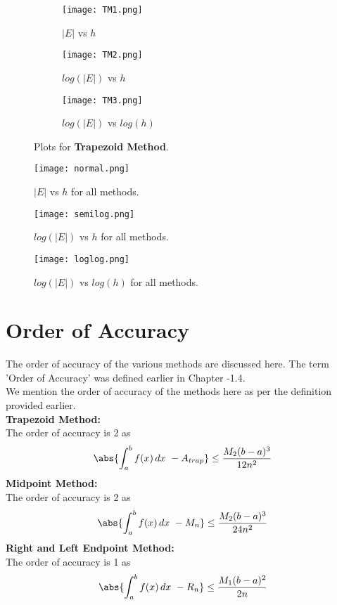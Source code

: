 \documentclass[a4paper, 12pt]{report}
\begin{document}
\begin{figure}[!h]
\centering
\begin{subfigure}{.55\textwidth}
  \centering
  \texttt{[image: TM1.png]}
  \caption{$|E|$ vs $h$}
\end{subfigure}%
\begin{subfigure}{.55\textwidth}
  \centering
  \texttt{[image: TM2.png]}
  \caption{$log(|E|)$ vs $h$}
\end{subfigure}
\begin{subfigure}{.55\textwidth}
  \centering
  \texttt{[image: TM3.png]}
  \caption{$log(|E|)$ vs $log(h)$}
\end{subfigure}
\caption{Plots for \textbf{Trapezoid Method}.}
\label{fig:Plot4}
\end{figure}


\begin{figure}[!h]
    \centering
    \texttt{[image: normal.png]}
    \caption{$|E|$ vs $h$ for all methods.}
    \label{fig:normal}
    \end{figure}
\begin{figure}[!h]
    \centering
    \texttt{[image: semilog.png]}
    \caption{$log(|E|)$ vs $h$ for all methods.}
    \label{fig:semilog}
    \end{figure}
\begin{figure}[!h]
    \centering
    \texttt{[image: loglog.png]}
    \caption{$log(|E|)$ vs $log(h)$ for all methods.}
    \label{fig:loglog}
    \end{figure}
\section{Order of Accuracy}
The order of accuracy of the various methods are discussed here. The term 'Order of Accuracy' was defined earlier in Chapter -1.4.\\
We mention the order of accuracy of the methods here as per the definition provided earlier.\\
\textbf{Trapezoid Method: }\\
The order of accuracy is 2 as 
\begin{equation}
        \abs{ \int_{a}^{b} f(x)\,dx\  - A_{trap}} \leq \frac{M_{2}(b-a)^{3}}{12n^{2}}
    \end{equation}
\textbf{Midpoint Method: }\\
The order of accuracy is 2 as
\begin{equation}
        \abs{ \int_{a}^{b} f(x)\,dx\  - M_{n}} \leq \frac{M_{2}(b-a)^{3}}{24n^{2}}
    \end{equation}
\textbf{Right and Left Endpoint Method: }\\
The order of accuracy is 1 as
 \begin{equation}
        \abs{ \int_{a}^{b} f(x)\,dx\  - R_{n}} \leq \frac{M_{1}(b-a)^{2}}{2n}
    \end{equation}
    
\end{document}
